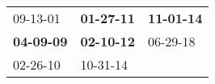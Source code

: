 \begin{supertabular}{p{0.33\columnwidth}p{0.33\columnwidth}p{0.33\columnwidth}}
          09-13-01\textsuperscript{} &  \textbf{01-27-11\textsuperscript{}} &  \textbf{11-01-14\textsuperscript{}} \\
 \textbf{04-09-09\textsuperscript{}} &  \textbf{02-10-12\textsuperscript{}} &           06-29-18\textsuperscript{} \\
          02-26-10\textsuperscript{} &           10-31-14\textsuperscript{} &                                      \\
\end{supertabular}
